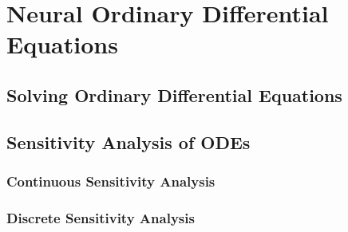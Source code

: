 \chapter{Neural Ordinary Differential Equations}
\label{chapter:neural_ode}

\section{Solving Ordinary Differential Equations}
\label{sec:ordinary_differential_equations}

\section{Sensitivity Analysis of ODEs}
\label{sec:sensitivity_analysis_odes}

\subsection{Continuous Sensitivity Analysis}
\label{subsec:continuous_sensitivity_analysis_odes}

\subsection{Discrete Sensitivity Analysis}
\label{subsec:discrete_sensitivity_analysis_odes}


